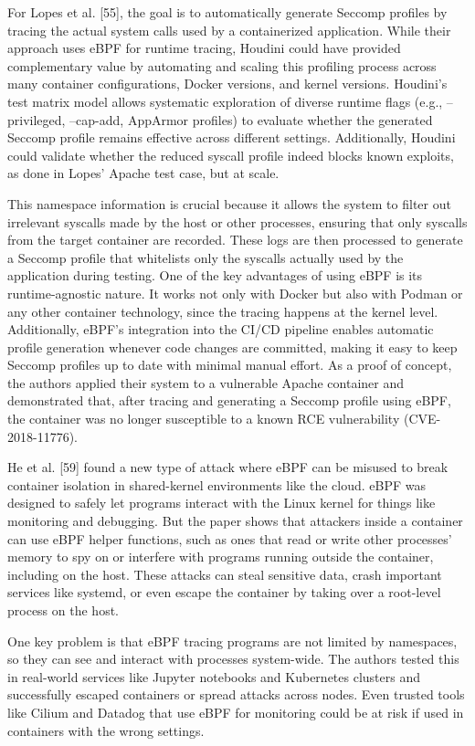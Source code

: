 \documentclass[12pt]{report}
\begin{document}
\begin{doublespace}
For Lopes et al. [55], the goal is to automatically generate Seccomp profiles by tracing the actual system calls used by a containerized application. While their approach uses eBPF for runtime tracing, Houdini could have provided complementary value by automating and scaling this profiling process across many container configurations, Docker versions, and kernel versions. Houdini’s test matrix model allows systematic exploration of diverse runtime flags (e.g., --privileged, --cap-add, AppArmor profiles) to evaluate whether the generated Seccomp profile remains effective across different settings. Additionally, Houdini could validate whether the reduced syscall profile indeed blocks known exploits, as done in Lopes' Apache test case, but at scale.

This namespace information is crucial because it allows the system to filter out irrelevant syscalls made by the host or other processes, ensuring that only syscalls from the target container are recorded. These logs are then processed to generate a Seccomp profile that whitelists only the syscalls actually used by the application during testing. One of the key advantages of using eBPF is its runtime-agnostic nature. It works not only with Docker but also with Podman or any other container technology, since the tracing happens at the kernel level. Additionally, eBPF's integration into the CI/CD pipeline enables automatic profile generation whenever code changes are committed, making it easy to keep Seccomp profiles up to date with minimal manual effort. As a proof of concept, the authors applied their system to a vulnerable Apache container and demonstrated that, after tracing and generating a Seccomp profile using eBPF, the container was no longer susceptible to a known RCE vulnerability (CVE-2018-11776).

He et al. [59] found a new type of attack where eBPF can be misused to break container isolation in shared-kernel environments like the cloud. eBPF was designed to safely let programs interact with the Linux kernel for things like monitoring and debugging. But the paper shows that attackers inside a container can use eBPF helper functions, such as ones that read or write other processes’ memory to spy on or interfere with programs running outside the container, including on the host. These attacks can steal sensitive data, crash important services like systemd, or even escape the container by taking over a root-level process on the host.

One key problem is that eBPF tracing programs are not limited by namespaces, so they can see and interact with processes system-wide. The authors tested this in real-world services like Jupyter notebooks and Kubernetes clusters and successfully escaped containers or spread attacks across nodes. Even trusted tools like Cilium and Datadog that use eBPF for monitoring could be at risk if used in containers with the wrong settings.


\end{doublespace}
\end{document}
